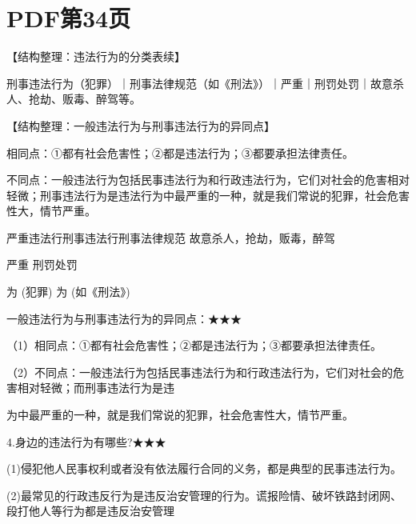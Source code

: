 \documentclass[lang=cn,11pt]{elegantbook}
\newcommand{\daofasym}[1]{{\daofasymbolfont #1}}
\newcommand{\daofasym}[1]{#1}
\begin{document}
\section*{PDF第34页}

【结构整理：违法行为的分类表续】\par

刑事违法行为（犯罪）｜刑事法律规范（如《刑法》）｜严重｜刑罚处罚｜故意杀人、抢劫、贩毒、醉驾等。\par

【结构整理：一般违法行为与刑事违法行为的异同点】\par

相同点：\daofasym{①}都有社会危害性；\daofasym{②}都是违法行为；\daofasym{③}都要承担法律责任。\par

不同点：一般违法行为包括民事违法行为和行政违法行为，它们对社会的危害相对轻微；刑事违法行为是违法行为中最严重的一种，就是我们常说的犯罪，社会危害性大，情节严重。\par

严重违法行刑事违法行刑事法律规范 故意杀人，抢劫，贩毒，醉驾\par

严重 刑罚处罚\par

为 (犯罪) 为 (如《刑法》)\par

一般违法行为与刑事违法行为的异同点：\daofasym{★}\daofasym{★}\daofasym{★}\par

（1）相同点：\daofasym{①}都有社会危害性；\daofasym{②}都是违法行为；\daofasym{③}都要承担法律责任。\par

（2）不同点：一般违法行为包括民事违法行为和行政违法行为，它们对社会的危害相对轻微；而刑事违法行为是违\par

为中最严重的一种，就是我们常说的犯罪，社会危害性大，情节严重。\par

4.身边的违法行为有哪些?\daofasym{★}\daofasym{★}\daofasym{★}\par

(1)侵犯他人民事权利或者没有依法履行合同的义务，都是典型的民事违法行为。\par

(2)最常见的行政违反行为是违反治安管理的行为。谎报险情、破坏铁路封闭网、段打他人等行为都是违反治安管理\par
\end{document}

